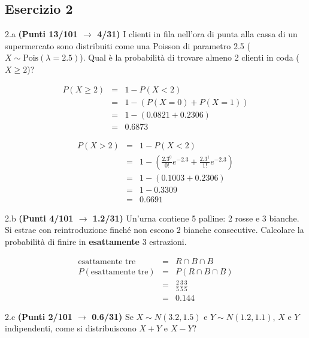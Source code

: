 \documentclass[
  11pt,
]{book}
\theoremstyle{mytheoremstyle}
\theoremstyle{mydefstyle}
\newenvironment{sol}
  {
  \begin{tcolorbox}[enhanced,breakable,arc=0.1mm,boxrule=1pt,colback=white,colframe=iblue,
  title=\bf \fontfamily{lmss}\selectfont \hspace{.5 cm} Soluzione,drop fuzzy shadow]

}{
\end{tcolorbox}
  }
\begin{document}
\subsection{Esercizio 2}\label{esercizio-2-20}

2.a \textbf{(Punti 13/101 \(\rightarrow\) 4/31)} I clienti in fila nell'ora di punta alla cassa di un supermercato sono distribuiti come una Poisson di parametro 2.5 (\(X\sim\text{Pois}(\lambda=2.5)\)). Qual è la probabilità di trovare almeno 2 clienti in coda (\(X\ge 2\))?

\begin{sol}
\begin{eqnarray*}
  P(X\ge 2) &=&  1-P(X<2)\\
  &=& 1-(P(X=0)+P(X=1))\\
  &=& 1-(0.0821+0.2306)\\
  &=& 0.6873
\end{eqnarray*}

\begin{eqnarray*}
   P( X > 2 ) &=& 1-P( X < 2 ) \\                 &=& 1-\left( \frac{ 2.3 ^{ 0 }}{ 0 !}e^{- 2.3 }+\frac{ 2.3 ^{ 1 }}{ 1 !}e^{- 2.3 } \right)\\                 &=& 1-( 0.1003+0.2306 )\\                 &=& 1- 0.3309 \\                 &=&   0.6691 
\end{eqnarray*}

\end{sol}

2.b \textbf{(Punti 4/101 \(\rightarrow\) 1.2/31)} Un'urna contiene 5 palline: 2 rosse e 3 bianche. Si estrae con reintroduzione finché non escono 2 bianche consecutive. Calcolare la probabilità di finire in \textbf{esattamente} 3 estrazioni.

\begin{sol}
\begin{eqnarray*}
  \text{esattamente tre} &=& R\cap B\cap B \\
  P(\text{esattamente tre}) &=& P(R\cap B\cap B)\\
  &=&\frac 25 \frac 35\frac 35\\
  &=& 0.144
\end{eqnarray*}

\end{sol}

2.c \textbf{(Punti 2/101 \(\rightarrow\) 0.6/31)} Se \(X\sim N(3.2,1.5)\) e \(Y\sim N(1.2,1.1)\), \(X\) e \(Y\) indipendenti, come si distribuiscono \(X+Y\) e \(X-Y\)?
\end{document}
